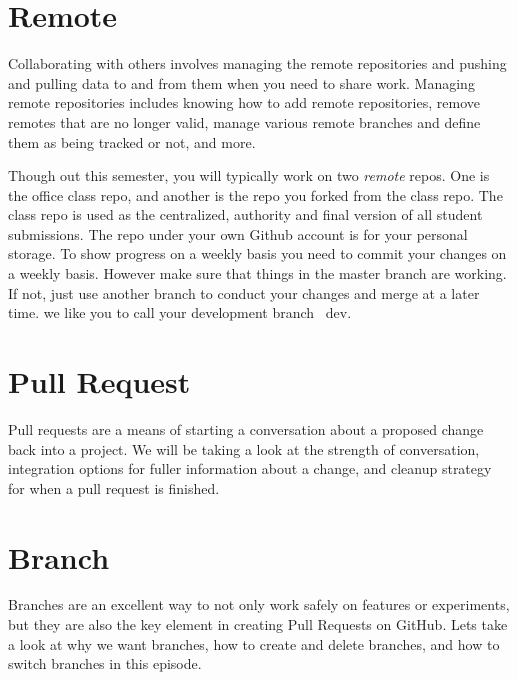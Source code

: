 
\section{Remote}\label{remote}

Collaborating with others involves managing the remote repositories
and pushing and pulling data to and from them when you need to share
work. Managing remote repositories includes knowing how to add remote
repositories, remove remotes that are no longer valid, manage various
remote branches and define them as being tracked or not, and more.

Though out this semester, you will typically work on two \textit{remote} repos.
One is the office class repo, and another is the repo you forked from
the class repo. The class repo is used as the centralized, authority and
final version of all student submissions. The repo under your own Github
account is for your personal storage. To show progress on a weekly
basis you need to commit your changes on a weekly basis. However make
sure that things in the master branch are working. If not, just use
another branch to conduct your changes and merge at a later
time. we like you to call your development branch {\ dev}.


\section{Pull Request}\label{pull-request}

Pull requests are a means of starting a conversation about a proposed
change back into a project. We will be taking a look at the strength of
conversation, integration options for fuller information about a change,
and cleanup strategy for when a pull request is finished.


\section{Branch}\label{branch}

Branches are an excellent way to not only work safely on features or
experiments, but they are also the key element in creating Pull Requests
on GitHub. Lets take a look at why we want branches, how to create and
delete branches, and how to switch branches in this episode.

